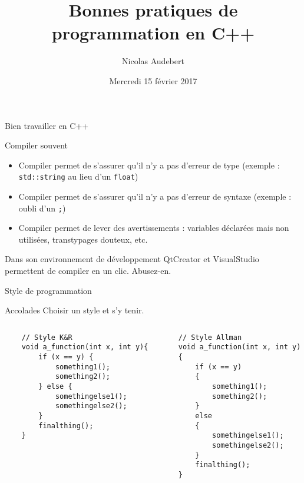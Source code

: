 \documentclass{beamer}
\begin{document}
\title{Bonnes pratiques de programmation en C++}
\date[15 fév. 2017]{Mercredi 15 février 2017}
\author[nicolas.audebert@onera.fr]{Nicolas Audebert}
\institute{}

\setmainfont{Fira Sans}
\maketitle

\begin{frame}{Bien travailler en C++}

\begin{block}{Compiler souvent}
    \begin{itemize}
        \item Compiler permet de s'assurer qu'il n'y a pas d'erreur de type (exemple : \texttt{std::string} au lieu d'un \texttt{float})
        \item Compiler permet de s'assurer qu'il n'y a pas d'erreur de syntaxe (exemple : oubli d'un \texttt{;})
        \item Compiler permet de lever des avertissements : variables déclarées mais non utilisées, transtypages douteux, etc.
    \end{itemize}
\end{block}

\begin{block}{Dans son environnement de développement}
QtCreator et VisualStudio permettent de compiler en un clic. Abusez-en.
\end{block}

\end{frame}

\begin{frame}[fragile]{Style de programmation}

\begin{block}{Accolades}
Choisir un style et s'y tenir.
\end{block}

\begin{columns}
    \begin{column}{0.5\textwidth}
    \begin{verbatim}
    // Style K&R
    void a_function(int x, int y){
        if (x == y) {
            something1();
            something2();
        } else {
            somethingelse1();
            somethingelse2();
        }
        finalthing();
    }
    \end{verbatim}
    \end{column}
    \begin{column}{0.5\textwidth}
    \begin{verbatim}
    // Style Allman
    void a_function(int x, int y)
    {
        if (x == y)
        {
            something1();
            something2();
        }
        else
        {
            somethingelse1();
            somethingelse2();
        }
        finalthing();
    }
    \end{verbatim}
    \end{column}
\end{columns}
\end{frame}
\end{document}
